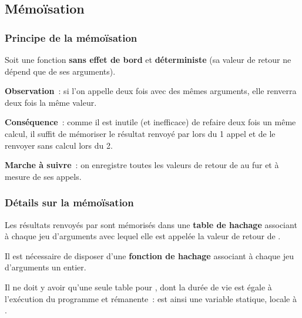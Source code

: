 \subsection{Mémoïsation}

\begin{frame}[fragile]
\frametitle{Principe de la mémoïsation}
Soit  une fonction {\bf sans effet de bord} et
{\bf déterministe} (sa valeur de retour ne dépend que de ses arguments).
\bigskip
\bigskip

{\bf Observation}~: si l'on appelle  deux fois avec des
mêmes arguments, elle renverra deux fois la même valeur.
\bigskip

{\bf Conséquence}~: comme il est inutile (et inefficace) de refaire deux
fois un même calcul, il suffit de mémoriser le résultat renvoyé par
 lors du 1\ier{} appel et de le renvoyer sans calcul lors du
2\ieme{}.
\bigskip

{\bf Marche à suivre}~: on enregistre toutes les valeurs de retour de
 au fur et à mesure de ses appels.
\end{frame}

\begin{frame}[fragile]
\frametitle{Détails sur la mémoïsation}
Les résultats renvoyés par  sont mémorisés dans une
{\bf table de hachage}  associant à chaque jeu d'arguments
avec lequel elle est appelée la valeur de retour de .
\bigskip
\bigskip

Il est nécessaire de disposer d'une {\bf fonction de hachage} 
associant à chaque jeu d'arguments un entier.
\bigskip
\bigskip

Il ne doit y avoir qu'une seule table  pour , dont
la durée de vie est égale à l'exécution du programme et rémanente~:
 est ainsi une \alert{variable statique}, locale à .
\end{frame}

